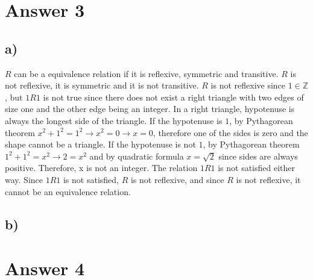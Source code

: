 \documentclass[12pt]{article}
\begin{document}
\section*{Answer 3}
\subsection*{a) }
$R$ can be a equivalence relation if it is reflexive, symmetric and transitive.
$R$ is not reflexive, it is symmetric and it is not transitive.
$R$ is not reflexive since $1 \in \mathbb{Z}$, but $1R1$ is not true since there does not exist a right triangle with two edges of size one and the other edge being an integer.
In a right triangle, hypotenuse is always the longest side of the triangle.
If the hypotenuse is $1$, by Pythagorean theorem $x^2 + 1^2 = 1^2 \to x^2 = 0 \to x = 0$, therefore one of the sides is zero and the shape cannot be a triangle.
If the hypotenuse is not $1$, by Pythagorean theorem $1^2 + 1^2 = x^2 \to 2 = x^2$ and by quadratic formula $x=\sqrt{2}$ since sides are always positive.
Therefore, x is not an integer.
The relation $1R1$ is not satisfied either way.
Since $1R1$ is not satisfied, $R$ is not reflexive, and since $R$ is not reflexive, it cannot be an equivalence relation.

\subsection*{b) }

\section*{Answer 4}
\end{document}
